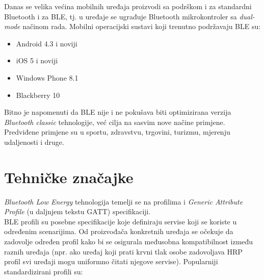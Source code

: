 Danas se velika većina mobilnih uređaja proizvodi sa podrškom i za standardni Bluetooth i za BLE, tj. u uređaje se ugrađuje Bluetooth mikrokontroler sa \textit{dual-mode} načinom rada. 
Mobilni operacijski sustavi koji trenutno podržavaju BLE su:

\begin{itemize}
    \item Android 4.3 i noviji
    \item iOS 5 i noviji
    \item Windows Phone 8.1
    \item Blackberry 10
\end{itemize}
Bitno je napomenuti da BLE nije i ne pokušava biti optimizirana verzija \textit{Bluetooth classic} tehnologije, već cilja na sasvim nove načine primjene. 
Predviđene primjene su u sportu, zdravstvu, trgovini, turizmu, mjerenju udaljenosti i druge.


\section{Tehničke značajke}

\textit{Bluetooth Low Energy} tehnologija temelji se na profilima i \textit{Generic Attribute Profile} (u daljnjem tekstu GATT) specifikaciji. 
\\
BLE profili su posebne specifikacije koje definiraju servise koji se koriste u određenim scenarijima. 
Od proizvođača konkretnih uređaja se očekuje da zadovolje određen profil kako bi se osigurala međusobna kompatibilnost između raznih uređaja (npr. ako uređaj koji prati krvni tlak osobe zadovoljava HRP profil svi uređaji mogu uniformno čitati njegove servise). 
Popularniji standardizirani profili su:

